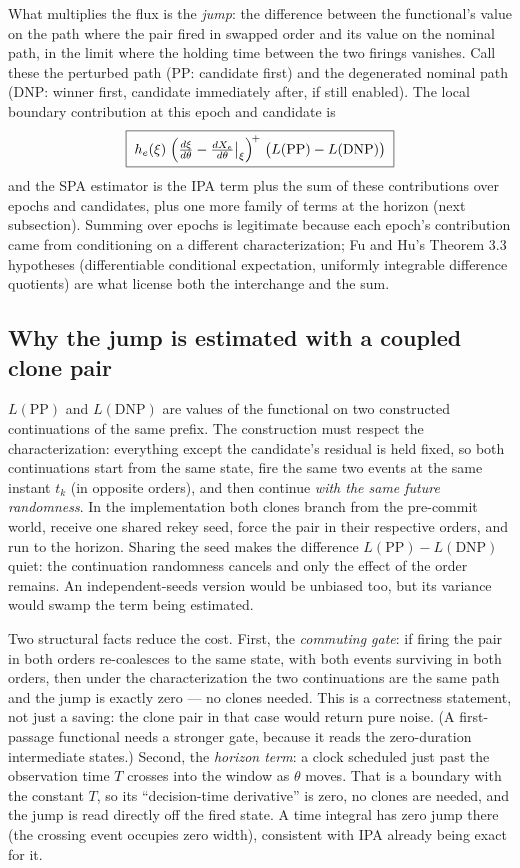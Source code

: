 \documentclass[11pt]{article}
\begin{document}
What multiplies the flux is the \emph{jump}: the difference between the
functional's value on the path where the pair fired in swapped order and
its value on the nominal path, in the limit where the holding time
between the two firings vanishes. Call these the perturbed path (PP:
candidate first) and the degenerated nominal path (DNP: winner first,
candidate immediately after, if still enabled). The local boundary
contribution at this epoch and candidate is
\[
\boxed{\;
h_e(\xi)\;\Bigl(\tfrac{d\xi}{d\theta} - \tfrac{dX_e}{d\theta}\big|_{\xi}\Bigr)^{\!+}\;
\bigl(L(\mathrm{PP}) - L(\mathrm{DNP})\bigr)
\;}
\]
and the SPA estimator is the IPA term plus the sum of these
contributions over epochs and candidates, plus one more family of terms
at the horizon (next subsection). Summing over epochs is legitimate
because each epoch's contribution came from conditioning on a different
characterization; Fu and Hu's Theorem 3.3 hypotheses (differentiable
conditional expectation, uniformly integrable difference quotients) are
what license both the interchange and the sum.

\subsection{Why the jump is estimated with a coupled clone pair}

$L(\mathrm{PP})$ and $L(\mathrm{DNP})$ are values of the functional on
two constructed continuations of the same prefix. The construction must
respect the characterization: everything except the candidate's residual
is held fixed, so both continuations start from the same state, fire the
same two events at the same instant $t_k$ (in opposite orders), and then
continue \emph{with the same future randomness}. In the implementation
both clones branch from the pre-commit world, receive one shared rekey
seed, force the pair in their respective orders, and run to the horizon.
Sharing the seed makes the difference $L(\mathrm{PP}) - L(\mathrm{DNP})$
quiet: the continuation randomness cancels and only the effect of the
order remains. An independent-seeds version would be unbiased too, but
its variance would swamp the term being estimated.

Two structural facts reduce the cost. First, the \emph{commuting gate}:
if firing the pair in both orders re-coalesces to the same state, with
both events surviving in both orders, then under the characterization the
two continuations are the same path and the jump is exactly zero --- no
clones needed. This is a correctness statement, not just a saving: the
clone pair in that case would return pure noise. (A first-passage
functional needs a stronger gate, because it reads the zero-duration
intermediate states.) Second, the \emph{horizon term}: a clock scheduled
just past the observation time $T$ crosses into the window as $\theta$
moves. That is a boundary with the constant $T$, so its ``decision-time
derivative'' is zero, no clones are needed, and the jump is read directly
off the fired state. A time integral has zero jump there (the crossing
event occupies zero width), consistent with IPA already being exact for
it.
\end{document}
